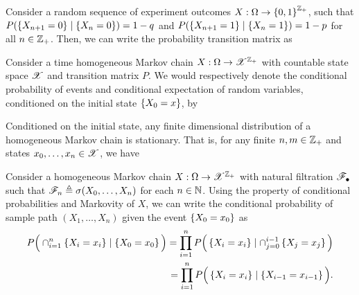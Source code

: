 \documentclass[12pt,aspectratio=169]{beamer}
\begin{document}
\begin{frame}
\begin{Example}
\label{exmp:MarkovBerExp}
Consider a random sequence of experiment outcomes $X: \Omega\to\left\{0,1\right\}^{\mathbb{Z}_+}$, 
such that $P(\left\{X_{n+1} = 0\right\}\mid\left\{X_n=0\right\})= 1-q$ and $P(\left\{X_{n+1} = 1\right\}\mid\left\{X_n=1\right\})= 1-p$ for all $n \in \mathbb{Z}_+$. 
Then, we can write the probability transition matrix as  
\end{Example}
\end{frame}


\begin{frame}
\begin{Definition}
Consider a time homogeneous Markov chain $X: \Omega \to \mathscr{X}^{\mathbb{Z}_+}$ %
with countable state space $\mathscr{X}$ and transition matrix $P$. 
We would respectively denote the conditional probability of events and conditional expectation of random variables, conditioned on the initial state $\left\{X_0 = x\right\}$, by 
\end{Definition}
\end{frame}


\begin{frame}
\begin{prop}
Conditioned on the initial state, any finite dimensional distribution of a homogeneous Markov chain is stationary. 
That is, for any finite $n,m \in \mathbb{Z}_+$ and states $x_0, \dots, x_n \in \mathscr{X}$, we have 
\end{prop}
\end{frame}


\begin{frame}
\begin{Proof}
Consider a homogeneous Markov chain $X:\Omega\to\mathscr{X}^{\mathbb{Z}_+}$ with natural filtration $\mathscr{F}_\bullet$ such that $\mathscr{F}_n \triangleq \sigma(X_0, \dots, X_n)$ for each $n\in\mathbb{N}$. 
Using the property of conditional probabilities and Markovity of $X$, 
we can write the conditional probability of sample path $(X_1, \dots, X_n)$ given the event $\left\{X_0 = x_0\right\}$ as 
\begin{align*}
P\Big(\cap_{i=1}^n\left\{X_i = x_i\right\}\mid\left\{X_0=x_0\right\}\Big)
= \prod_{i=1}^nP\Big(\left\{X_i = x_i\right\}\mid\cap_{j=0}^{i-1}\left\{X_j=x_j\right\}\Big)\\
= \prod_{i=1}^nP\Big(\left\{X_i = x_i\right\}\mid\left\{X_{i-1}=x_{i-1}\right\}\Big).
\end{align*}
\end{Proof}
\end{frame}
\end{document}
